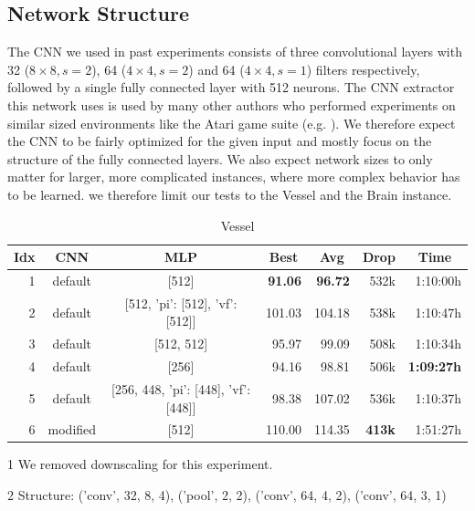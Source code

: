 \subsection{Network Structure} \label{sec:Eval/NetworkStructure}
The CNN we used in past experiments consists of three convolutional layers with 32 ($8 \times 8, s=2$), 64 ($4\times4, s=2$) and 64 ($4 \times 4, s=1$) filters respectively, followed by a single fully connected layer with 512 neurons. The CNN extractor this network uses is used by many other authors who performed experiments on similar sized environments like the Atari game suite (e.g. \cite{burda2018large, burda2018exploration, mnih2015human}). We therefore expect the CNN to be fairly optimized for the given input and mostly focus on the structure of the fully connected layers. We also expect network sizes to only matter for larger, more complicated instances, where more complex behavior has to be learned. we therefore limit our tests to the Vessel and the Brain instance.

\begin{table}[htp]
    \begin{center}
        \begin{threeparttable}
            \begin{tabular}{rccrrrr}
                \toprule
                \multicolumn{1}{c}{Idx} & \multicolumn{1}{c}{CNN} & \multicolumn{1}{c}{MLP} & \multicolumn{1}{c}{Best} & \multicolumn{1}{c}{Avg} & \multicolumn{1}{c}{Drop} & \multicolumn{1}{c}{Time}\\
                \midrule
                1 & default & [512] & \textbf{91.06} & \textbf{96.72} & 532k & 1:10:00h \\
                2 & default & [512, 'pi': [512], 'vf': [512]] & 101.03 & 104.18 & 538k & 1:10:47h \\
                3 & default & [512, 512] & 95.97 & 99.09 & 508k & 1:10:34h \\
                4 & default & [256] & 94.16 & 98.81 & 506k & \textbf{1:09:27h} \\
                5 & default & [256, 448, 'pi': [448], 'vf': [448]] & 98.38 & 107.02 & 536k & 1:10:37h \\
                6\tnote{1} & modified\tnote{2} & [512] & 110.00 & 114.35 & \textbf{413k} & 1:51:27h \\
                \bottomrule
            \end{tabular}
            \begin{tablenotes} \footnotesize
                \item[1] We removed downscaling for this experiment.
                \item[2] Structure: ('conv', 32, 8, 4), ('pool', 2, 2), ('conv', 64, 4, 2), ('conv', 64, 3, 1)
            \end{tablenotes}

        \end{threeparttable}
        
    \end{center}
    \caption{Vessel}
\end{table}

